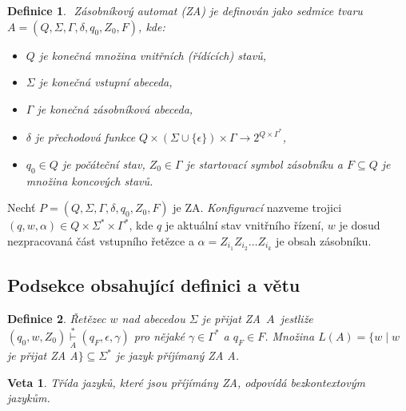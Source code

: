 \documentclass [11pt, a4paper, twocolumn] {article}
\newtheorem{Definice}{Definice}
\newtheorem{Veta}{Veta}
\begin{document}
\begin{Definice}
    ${}$ \textnormal{Zásobníkový automat} (ZA) je definován jako sedmice tvaru $A = (Q, \Sigma, \Gamma, \delta, q_{0}, Z_{0}, F) $, kde:

    \begin{itemize}
        \item $Q$  je konečná množina \textnormal{vnitřních (řídících) stavů,}
        \item $\Sigma $ je konečná \textnormal{vstupní abeceda,}
        \item $\Gamma $ je konečná \textnormal{zásobníková abeceda,}
        \item $\delta$   je \textnormal{přechodová funkce} $Q \times (\Sigma \cup \{\epsilon\}) \times \Gamma \rightarrow 2^{Q \times \Gamma^*} $,
        \item $q_{0} \in Q $  je \textnormal{počáteční stav, $Z_{0} \in \Gamma $ }je\textnormal{ startovací symbol zásobníku a $F \subseteq Q $ } je množina\textnormal{ koncových stavů.}
    \end{itemize}
\end{Definice}
 
Nechť $P = (Q, \Sigma, \Gamma, \delta, q_{0}, Z_{0}, F) $ je ZA. \textit{Konfigurací} nazveme trojici $(q, w, \alpha ) \in Q \times \Sigma^* \times \Gamma^* $, kde $q$ je aktuální stav vnitřního řízení, $w$ je dosud nezpracovaná část vstupního řetězce a $\alpha = Z_{i_{1}} Z_{i_{2}} \dots Z_{i_{k}}$ je obsah zásobníku.

\subsection{Podsekce obsahující definici a větu}

\begin{Definice}
    \textnormal{Řetězec} $ w $ \textnormal{nad abecedou} $ \Sigma $ \textnormal{je přijat ZA}~$ A $~jest\-liže \mbox{$(q_{0}, w, Z_{0}) \overset{*}{\underset{A}{\vdash}} (q_{F}, \epsilon, \gamma) $} pro nějaké \mbox{$\gamma \in \Gamma^{*}  $} a \mbox{$q_{F} \in F $}.
    Množina $L(A) = \{w \;|\; w$ je přijat ZA A$\} \subseteq \Sigma^{*} $ je \textnormal{jazyk příjímaný} ZA A.
\end{Definice}

\begin{Veta}
    Třída jazyků, které jsou příjímány ZA, odpovídá \textnormal{bezkontextovým jazykům.}
\end{Veta}
\end{document}
